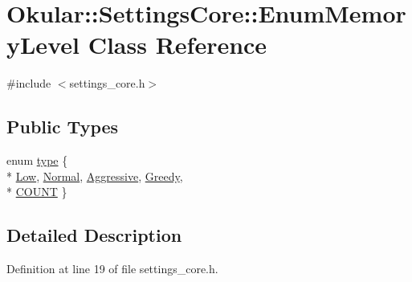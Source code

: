 \hypertarget{classOkular_1_1SettingsCore_1_1EnumMemoryLevel}{\section{Okular\+:\+:Settings\+Core\+:\+:Enum\+Memory\+Level Class Reference}
\label{classOkular_1_1SettingsCore_1_1EnumMemoryLevel}
}


{\ttfamily \#include $<$settings\+\_\+core.\+h$>$}

\subsection*{Public Types}
\begin{DoxyCompactItemize}
\item 
enum \hyperlink{classOkular_1_1SettingsCore_1_1EnumMemoryLevel_a6dcad4c36c335a5cab78f24dd88090b4}{type} \{ \\*
\hyperlink{classOkular_1_1SettingsCore_1_1EnumMemoryLevel_a6dcad4c36c335a5cab78f24dd88090b4aa61e4f07eed0bf070a41fb0998e8c3b5}{Low}, 
\hyperlink{classOkular_1_1SettingsCore_1_1EnumMemoryLevel_a6dcad4c36c335a5cab78f24dd88090b4aab69bfc6de34e8bf9634a7586486296a}{Normal}, 
\hyperlink{classOkular_1_1SettingsCore_1_1EnumMemoryLevel_a6dcad4c36c335a5cab78f24dd88090b4a5f4aefbf160a235d1c3219eeca91f898}{Aggressive}, 
\hyperlink{classOkular_1_1SettingsCore_1_1EnumMemoryLevel_a6dcad4c36c335a5cab78f24dd88090b4a0c192fe00a744fb84cbc63d9431fbe2a}{Greedy}, 
\\*
\hyperlink{classOkular_1_1SettingsCore_1_1EnumMemoryLevel_a6dcad4c36c335a5cab78f24dd88090b4a9f4d6aa58e26f00075b19021d2590a40}{C\+O\+U\+N\+T}
 \}
\end{DoxyCompactItemize}


\subsection{Detailed Description}


Definition at line 19 of file settings\+\_\+core.\+h.



